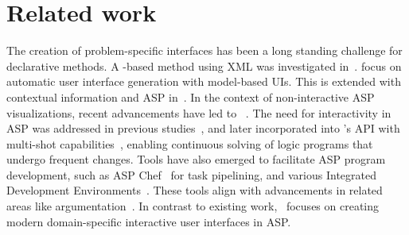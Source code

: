 \section{Related work}
\label{sec:related}

The creation of problem-specific interfaces has been a long standing challenge for declarative methods.
A \prolog-based method using XML was investigated in~\cite{schsei12a}.
\cite{schel96a} focus on automatic user interface generation with model-based UIs.
This is extended with contextual information and ASP in~\cite{zakzag11a}.
In the context of non-interactive ASP visualizations, recent advancements have led to \clingraph~\cite{hasascst22a}.
The need for interactivity in ASP was addressed in previous studies~\cite{geobsc15a},
and later incorporated into \clingo's API with multi-shot capabilities~\cite{karoscwa21a},
enabling continuous solving of logic programs that undergo frequent changes.
Tools have also emerged to facilitate ASP program development,
such as ASP Chef~\cite{alcrro23a} for task pipelining,
and various Integrated Development Environments~\cite{fereri11a,buoepuskto13a}.
These tools align with advancements in related areas like argumentation~\cite{dachselt2022nexas}.
In contrast to existing work,
\clinguin\ focuses on creating modern domain-specific interactive user interfaces in ASP.